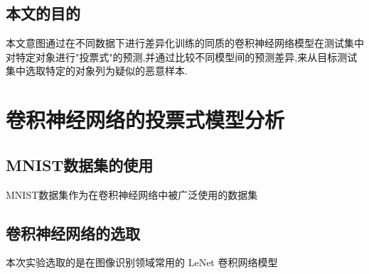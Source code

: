 \section{本文的目的}

本文意图通过在不同数据下进行差异化训练的同质的卷积神经网络模型在测试集中对特定对象进行"投票式"的预测,并通过比较不同模型间的预测差异,来从目标测试集中选取特定的对象列为疑似的恶意样本.

\chapter{卷积神经网络的投票式模型分析}

\section{MNIST数据集的使用}

MNIST数据集作为在卷积神经网络中被广泛使用的数据集

\section{卷积神经网络的选取}

本次实验选取的是在图像识别领域常用的 LeNet 卷积网络模型